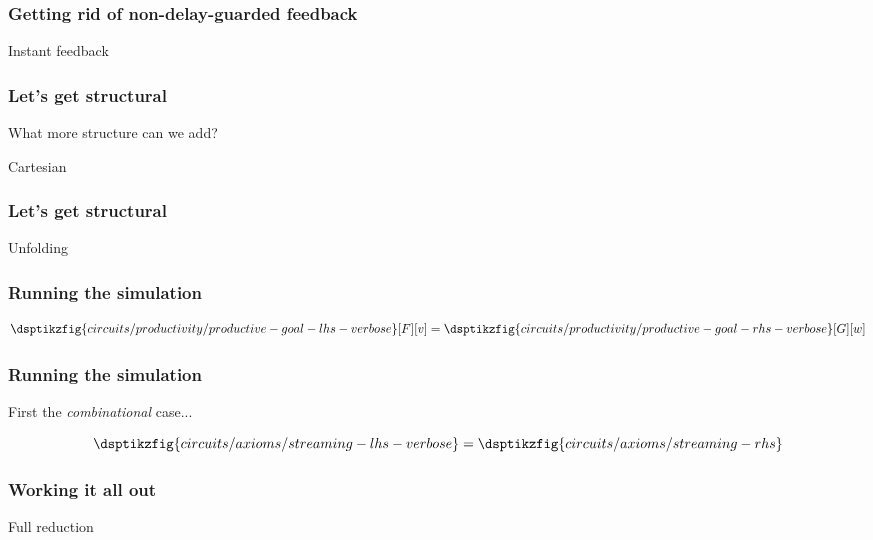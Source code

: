 \begin{frame}
    \frametitle{Getting rid of non-delay-guarded feedback}

    Instant feedback

\end{frame}
\begin{frame}
    \frametitle{Let's get structural}

    What more structure can we add?

    Cartesian

\end{frame}
\begin{frame}
    \frametitle{Let's get structural}

    Unfolding

\end{frame}
\begin{frame}
    \frametitle{Running the simulation}

    \centering
    \begin{equation*}
        \dsptikzfig{circuits/productivity/productive-goal-lhs-verbose}[F][v]
        =
        \dsptikzfig{circuits/productivity/productive-goal-rhs-verbose}[G][w]
    \end{equation*}

\end{frame}
\begin{frame}
    \frametitle{Running the simulation}

    First the \emph{combinational} case...

    \centering
    \begin{equation*}
        \dsptikzfig{circuits/axioms/streaming-lhs-verbose}
        =
        \dsptikzfig{circuits/axioms/streaming-rhs}
    \end{equation*}

\end{frame}
\begin{frame}
    \frametitle{Working it all out}

    Full reduction

\end{frame}
